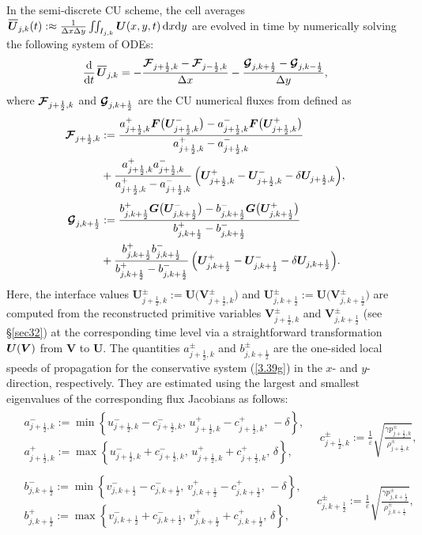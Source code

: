 \documentclass[A4paper,12pt,twoside]{article}
\numberwithin{equation}{section}
\numberwithin{figure}{section}
\numberwithin{table}{section}
\newcommand{\dx}{\Delta x}
\newcommand{\dy}{\Delta y}
\newcommand{\kph}{{k+\frac{1}{2}}}
\newcommand{\kmh}{{k-\frac{1}{2}}}
\newcommand{\jph}{{j+\frac{1}{2}}}
\newcommand{\jmh}{{j-\frac{1}{2}}}
\newcommand{\bV}{\bm{V}}
\newcommand{\ve}{\varepsilon}
\newcommand\eref[1]{(\ref{#1})}
\newcommand*\xbar[1]{%
  \hbox{%
    \vbox{%
      \hrule height 0.5pt %
      \kern0.4ex%
      \hbox{%
        \kern-0.05em%
        \ensuremath{#1}%
        \kern-0.00em%
      }%
    }%
  }%
}
\newcommand{\uvec}[2][3]{\boldsymbol{#2\mkern-#1mu}\mkern#1mu}
\newcommand{\bU}{\uvec{U}}
\begin{document}
In the semi-discrete CU scheme, the cell averages
$\,\xbar{\bm U}_{j,k}(t):\approx\frac{1}{\dx\dy}\iint_{I_{j,k}}\bm U(x,y,t)\,{\rm d}x{\rm d}y$ are evolved in time by numerically solving
the following system of ODEs:
\begin{equation}
\frac{{\rm d}}{{\rm d}t}\,\xbar{\bm U}_{j,k}=-\frac{\bm{{\cal F}}_{\jph,k}-\bm{{\cal F}}_{\jmh,k}}{\dx}-
\frac{\bm{{\cal G}}_{j,\kph}-\bm{{\cal G}}_{j,\kmh}}{\dy},
\label{2.15a}
\end{equation}
where $\bm{{\cal F}}_{\jph,k}$ and $\bm{{\cal G}}_{j,\kph}$ are the CU numerical fluxes from \cite{KLin} defined as
\begin{equation}
\begin{aligned}
\bm{{\cal F}}_{\jph,k}&:=\frac{a^+_{\jph,k}\bm F\big(\bm U^-_{\jph,k}\big)-a^-_{\jph,k}\bm F\big(\bm U^+_{\jph,k}\big)}
{a^+_{\jph,k}-a^-_{\jph,k}}\\
&+\frac{a^+_{\jph,k}a^-_{\jph,k}}{a^+_{\jph,k}-a^-_{\jph,k}}\,\Big(\bm U^+_{\jph,k}-\bm U^-_{\jph,k}-\delta\bm U_{\jph,k}\Big),\\[0.8ex]
\bm{{\cal G}}_{j,\kph}&:=\frac{b^+_{j,\kph}\bm G\big(\bm U^-_{j,\kph}\big)-b^-_{j,\kph}\bm G\big(\bm U^+_{j,\kph}\big)}
{b^+_{j,\kph}-b^-_{j,\kph}}\\
&+\frac{b^+_{j,\kph}b^-_{j,\kph}}{b^+_{j,\kph}-b^-_{j,\kph}}\,\Big(\bm U^+_{j,\kph}-\bm U^-_{j,\kph}-\delta\bm U_{j,\kph}\Big).
\end{aligned}
\label{3.41}
\end{equation}
Here, the interface values $\bm U_{\jph,k}^\pm:=\bm U\big(\bm V_{\jph,k}^\pm\big)$ and
$\bm U_{j,\kph}^\pm:=\bm U\big(\bm V_{j,\kph}^\pm\big)$ are computed from the reconstructed primitive variables $\bm V_{\jph,k}^\pm$ and 
$\bm V_{j,\kph}^\pm$ (see \S\ref{sec32}) at the corresponding time level via a straightforward transformation $\bU(\bV)$ from $\bm V$ to
$\bm U$. The quantities $a_{\jph,k}^\pm$ and $b_{j,\kph}^\pm$ are the one-sided local speeds of propagation for the conservative system
\eref{3.39g} in the $x$- and $y$-direction, respectively. They are estimated using the largest and smallest eigenvalues of the corresponding
flux Jacobians as follows:
\begin{equation}
\begin{aligned}
\begin{aligned}
&a^-_{\jph,k}:=\min\left\{u^-_{\jph,k}-c^-_{\jph,k},\,u^+_{\jph,k}-c^+_{\jph,k},\,-\delta\right\},\\
&a^+_{\jph,k}:=\max\left\{u^-_{\jph,k}+c^-_{\jph,k},\,u^+_{\jph,k}+c^+_{\jph,k},\,\delta\right\},
\end{aligned}\quad c^\pm_{\jph,k}:=\frac{1}{\ve}\sqrt{\frac{\gamma p^\pm_{\jph,k}}{\rho^\pm_{\jph,k}}},\\[1.5ex]
\begin{aligned}
&b^-_{j,\kph}:=\min\left\{v^-_{j,\kph}-c^-_{j,\kph},\,v^+_{j,\kph}-c^+_{j,\kph},\,-\delta\right\},\\
&b^+_{j,\kph}:=\max\left\{v^-_{j,\kph}+c^-_{j,\kph},\,v^+_{j,\kph}+c^+_{j,\kph},\,\delta\right\},
\end{aligned}\quad c^\pm_{j,\kph}:=\frac{1}{\ve}\sqrt{\frac{\gamma p^\pm_{j,\kph}}{\rho^\pm_{j,\kph}}},
\end{aligned}
\label{3.42}
\end{equation}
\end{document}
